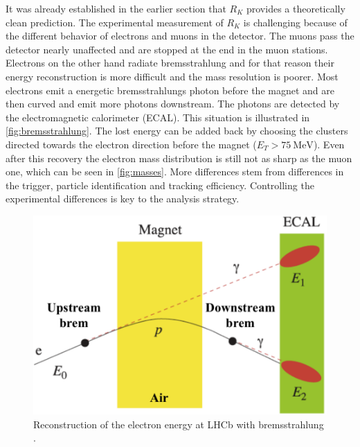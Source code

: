 
It was already established in the earlier section that $R_K$ provides
a theoretically clean prediction.
The experimental measurement of $R_K$ is challenging because
of the different behavior of electrons and muons in the detector.
The muons pass the detector nearly unaffected and are stopped at the end
in the muon stations.
Electrons on the other hand radiate bremsstrahlung and for that
reason their energy reconstruction is more difficult
and the mass resolution is poorer.
Most electrons emit a energetic bremsstrahlungs photon before the magnet and
are then curved and emit more photons downstream. The photons are detected by the
electromagnetic calorimeter (ECAL).
This situation is illustrated
in \autoref{fig:bremsstrahlung}.
The lost energy can be added back by choosing
the clusters directed towards the electron direction before the magnet ($E_{T}>\SI{75}{\mega\electronvolt}$).
Even after this recovery the electron mass distribution is still not as sharp as the muon one, which can
be seen in \autoref{fig:masses}.
More differences stem from differences in the trigger, particle identification and tracking efficiency.
Controlling the experimental differences is key to the analysis strategy.\vspace{-2em}
\begin{figure}
	\centering
	\includegraphics[width=0.6\linewidth]{media/electronbrems.png}
	\caption{Reconstruction of the electron energy at LHCb with bremsstrahlung \cite{petridis2021test}.}%
	\label{fig:bremsstrahlung}
\end{figure}
